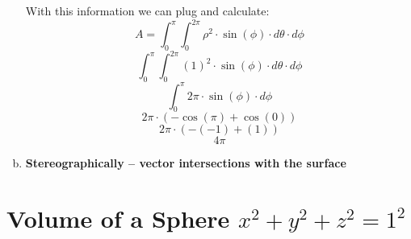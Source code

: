 \documentclass{article}
\begin{document}
\begin{enumerate}[a.]
            With this information we can plug and calculate:
            \[ A =\int_{0}^{\pi}\int_{0}^{2\pi} \rho^2\cdot\sin(\phi)\cdot d\theta\cdot d\phi  \]
            \[ \int_{0}^{\pi}\int_{0}^{2\pi} (1)^2\cdot\sin(\phi)\cdot d\theta\cdot d\phi\]
            \[ \int_{0}^{\pi}2\pi \cdot \sin(\phi)\cdot d\phi \]
            \[ 2\pi \cdot (-\cos(\pi) + \cos(0)) \]
            \[ 2\pi \cdot (-(-1)+(1)) \]
            \[ 4\pi\]

	\item \textbf{Stereographically -- vector intersections with the surface}
\end{enumerate}

\section{Volume of a Sphere $x^2 + y^2 + z^2 = 1^2$}
\end{document}

